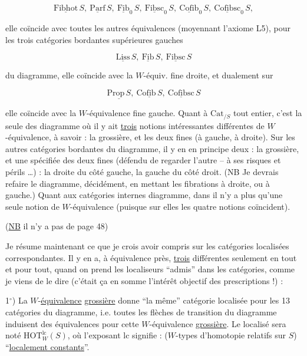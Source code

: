 \[
 \underline{\mathrm{Fibhot}}\,S,\ \underline{\mathrm{Parf}}\,S,\ \underline{\mathrm{Fib}}_0\,S,\ \underline{\mathrm{Fibsc}}_0\,S,\ \underline{\mathrm{Cofib}}_0\,S,\ \underline{\mathrm{Cofibsc}}_0\,S,
\]

elle coïncide avec toutes les autres équivalences \unsure{$\in$|$\varepsilon$} (moyennant l'axiome L5), pour les trois catégories bordantes supérieures gauches

\[
 \underline{\mathrm{Liss}}\,S,\ \underline{\mathrm{Fib}}\,S,\ \underline{\mathrm{Fibsc}}\,S
\]

du diagramme, elle coïncide avec la $W$-équiv. fine droite, et dualement sur

\[
 \underline{\mathrm{Prop}\,S},\ \underline{\mathrm{Cofib}\,S},\ \underline{\mathrm{Cofibsc}}\,S
\]

elle coïncide  avec la $W$-équivalence fine gauche. Quant à $\mathrm{Cat}_{/S}$ tout entier, c'est la seule des    diagramme où il y ait \uline{trois} notions intéressantes différentes de $W$-équivalence, à savoir : la grossière, et les deux fines (à gauche, à droite). Sur les autres  catégories bordantes du diagramme, il y en  en principe deux : la grossière, et une spécifiée des deux fines (défendu de regarder l'autre -- à ses risques et périls \ldots) : la droite du côté gauche, la gauche du côté droit. (NB Je devrais refaire le diagramme, décidément, en mettant les fibrations à droite, ou à gauche.) Quant aux  catégories internes  diagramme, dans  il n'y a plus qu'une seule notion de $W$-équivalence (puisque sur elles les quatre notions coïncident).

 (\uline{NB} il n'y a pas de page 48)

Je résume maintenant ce que je crois avoir compris sur les catégories localisées correspondantes. Il y en a, à équivalence près, \uline{trois} différentes seulement en tout et pour tout, quand on prend les localiseurs ``admis'' dans les catégories, comme je viens de le dire (c'était ça en somme l'intérêt objectif des prescriptions !) :   

1$^\circ$) La $W$-\uline{équivalence} \uline{grossière} donne ``la même'' catégorie localisée pour les 13 catégories du diagramme, i.e. toutes les flèches de transition du diagramme induisent des équivalences pour cette $W$-équivalence \uline{grossière}. Le localisé  sera noté $\boxed{\mathrm{HOT}^{\mathrm{lc}}_W(S)}$, où l'exposant lc signifie : ($W$-types d'homotopie relatifs sur $S$) ``\uline{localement constants}''.

